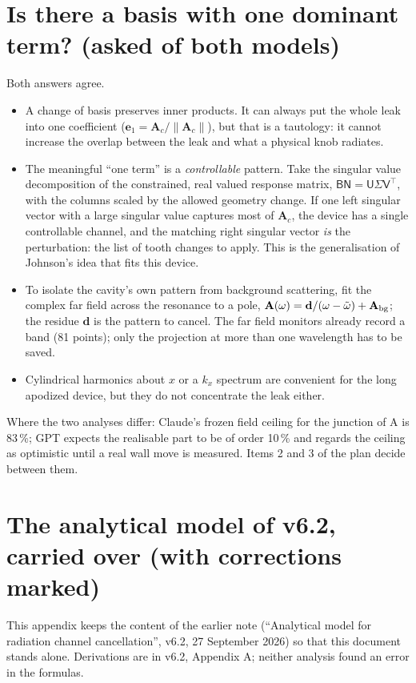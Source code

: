 \documentclass[11pt,a4paper]{article}
\begin{document}
\section{Is there a basis with one dominant term? (asked of both models)}
Both answers agree.
\begin{itemize}
\item A change of basis preserves inner products. It can always put the whole leak into one coefficient
($\mathbf e_1=\mathbf A_c/\|\mathbf A_c\|$), but that is a tautology: it cannot increase the overlap between the
leak and what a physical knob radiates.
\item The meaningful ``one term'' is a \emph{controllable} pattern. Take the singular value decomposition of the
constrained, real valued response matrix, $\mathsf{BN}=\mathsf U\Sigma\mathsf V^{\!\top}$, with the columns scaled
by the allowed geometry change. If one left singular vector with a large singular value captures most of
$\mathbf A_c$, the device has a single controllable channel, and the matching right singular vector \emph{is} the
perturbation: the list of tooth changes to apply. This is the generalisation of Johnson's idea that fits this device.
\item To isolate the cavity's own pattern from background scattering, fit the complex far field across the
resonance to a pole, $\mathbf A(\omega)=\mathbf d/(\omega-\tilde\omega)+\mathbf A_{\rm bg}$; the residue
$\mathbf d$ is the pattern to cancel. The far field monitors already record a band (81 points); only the
projection at more than one wavelength has to be saved.
\item Cylindrical harmonics about $x$ or a $k_x$ spectrum are convenient for the long apodized device, but they
do not concentrate the leak either.
\end{itemize}
Where the two analyses differ: Claude's frozen field ceiling for the junction of A is 83\,\%; GPT expects
the realisable part to be of order 10\,\% and regards the ceiling as optimistic until a real wall move is
measured. Items 2 and 3 of the plan decide between them.

\appendix
\section{The analytical model of v6.2, carried over (with corrections marked)}
This appendix keeps the content of the earlier note (``Analytical model for radiation channel cancellation'',
v6.2, 27 September 2026) so that this document stands alone. Derivations are in v6.2, Appendix A; neither
analysis found an error in the formulas.
\end{document}
